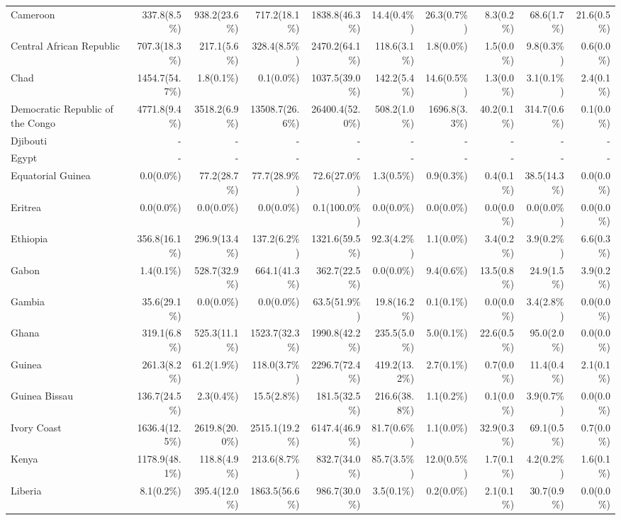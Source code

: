 \begin{scriptsize}
\begin{landscape}
\begin{center}
\begin{longtable}[ht]{lrrrrrrrrr}
			Cameroon&337.8(8.5\%)&938.2(23.6\%)&717.2(18.1\%)&1838.8(46.3\%)&14.4(0.4\%)&26.3(0.7\%)&8.3(0.2\%)&68.6(1.7\%)&21.6(0.5\%)\\
			Central African Republic&707.3(18.3\%)&217.1(5.6\%)&328.4(8.5\%)&2470.2(64.1\%)&118.6(3.1\%)&1.8(0.0\%)&1.5(0.0\%)&9.8(0.3\%)&0.6(0.0\%)\\
			Chad&1454.7(54.7\%)&1.8(0.1\%)&0.1(0.0\%)&1037.5(39.0\%)&142.2(5.4\%)&14.6(0.5\%)&1.3(0.0\%)&3.1(0.1\%)&2.4(0.1\%)\\
			Democratic Republic of the Congo&4771.8(9.4\%)&3518.2(6.9\%)&13508.7(26.6\%)&26400.4(52.0\%)&508.2(1.0\%)&1696.8(3.3\%)&40.2(0.1\%)&314.7(0.6\%)&0.1(0.0\%)\\
			Djibouti&-&-&-&-&-&-&-&-&-\\
			Egypt&-&-&-&-&-&-&-&-&-\\
			Equatorial Guinea&0.0(0.0\%)&77.2(28.7\%)&77.7(28.9\%)&72.6(27.0\%)&1.3(0.5\%)&0.9(0.3\%)&0.4(0.1\%)&38.5(14.3\%)&0.0(0.0\%)\\
			Eritrea&0.0(0.0\%)&0.0(0.0\%)&0.0(0.0\%)&0.1(100.0\%)&0.0(0.0\%)&0.0(0.0\%)&0.0(0.0\%)&0.0(0.0\%)&0.0(0.0\%)\\
			Ethiopia&356.8(16.1\%)&296.9(13.4\%)&137.2(6.2\%)&1321.6(59.5\%)&92.3(4.2\%)&1.1(0.0\%)&3.4(0.2\%)&3.9(0.2\%)&6.6(0.3\%)\\
			Gabon&1.4(0.1\%)&528.7(32.9\%)&664.1(41.3\%)&362.7(22.5\%)&0.0(0.0\%)&9.4(0.6\%)&13.5(0.8\%)&24.9(1.5\%)&3.9(0.2\%)\\
			Gambia&35.6(29.1\%)&0.0(0.0\%)&0.0(0.0\%)&63.5(51.9\%)&19.8(16.2\%)&0.1(0.1\%)&0.0(0.0\%)&3.4(2.8\%)&0.0(0.0\%)\\
			Ghana&319.1(6.8\%)&525.3(11.1\%)&1523.7(32.3\%)&1990.8(42.2\%)&235.5(5.0\%)&5.0(0.1\%)&22.6(0.5\%)&95.0(2.0\%)&0.0(0.0\%)\\
			Guinea&261.3(8.2\%)&61.2(1.9\%)&118.0(3.7\%)&2296.7(72.4\%)&419.2(13.2\%)&2.7(0.1\%)&0.7(0.0\%)&11.4(0.4\%)&2.1(0.1\%)\\
			Guinea Bissau&136.7(24.5\%)&2.3(0.4\%)&15.5(2.8\%)&181.5(32.5\%)&216.6(38.8\%)&1.1(0.2\%)&0.1(0.0\%)&3.9(0.7\%)&0.0(0.0\%)\\
			Ivory Coast&1636.4(12.5\%)&2619.8(20.0\%)&2515.1(19.2\%)&6147.4(46.9\%)&81.7(0.6\%)&1.1(0.0\%)&32.9(0.3\%)&69.1(0.5\%)&0.7(0.0\%)\\
			Kenya&1178.9(48.1\%)&118.8(4.9\%)&213.6(8.7\%)&832.7(34.0\%)&85.7(3.5\%)&12.0(0.5\%)&1.7(0.1\%)&4.2(0.2\%)&1.6(0.1\%)\\
			Liberia&8.1(0.2\%)&395.4(12.0\%)&1863.5(56.6\%)&986.7(30.0\%)&3.5(0.1\%)&0.2(0.0\%)&2.1(0.1\%)&30.7(0.9\%)&0.0(0.0\%)\\

\end{longtable}
\end{center}
\end{landscape}
\end{scriptsize}
